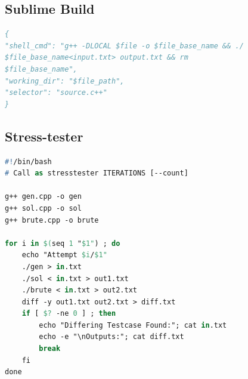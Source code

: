 \subsection*{Sublime Build}
\begin{lstlisting}[language= Pascal, commentstyle=\color{black}, numberstyle=\tiny\color{black}, keywordstyle=\color{black}, stringstyle=\color{black},
]
{
"shell_cmd": "g++ -DLOCAL $file -o $file_base_name && ./
$file_base_name<input.txt> output.txt && rm
$file_base_name",
"working_dir": "$file_path",
"selector": "source.c++"
}

\end{lstlisting}
\subsection*{Stress-tester}
\begin{lstlisting}[language= Pascal, commentstyle=\color{black}, numberstyle=\tiny\color{black}, keywordstyle=\color{black}, stringstyle=\color{black},
]
#!/bin/bash
# Call as stresstester ITERATIONS [--count]

g++ gen.cpp -o gen
g++ sol.cpp -o sol
g++ brute.cpp -o brute

for i in $(seq 1 "$1") ; do
    echo "Attempt $i/$1"
    ./gen > in.txt
    ./sol < in.txt > out1.txt
    ./brute < in.txt > out2.txt
    diff -y out1.txt out2.txt > diff.txt
    if [ $? -ne 0 ] ; then
        echo "Differing Testcase Found:"; cat in.txt
        echo -e "\nOutputs:"; cat diff.txt
        break
    fi
done
\end{lstlisting}
